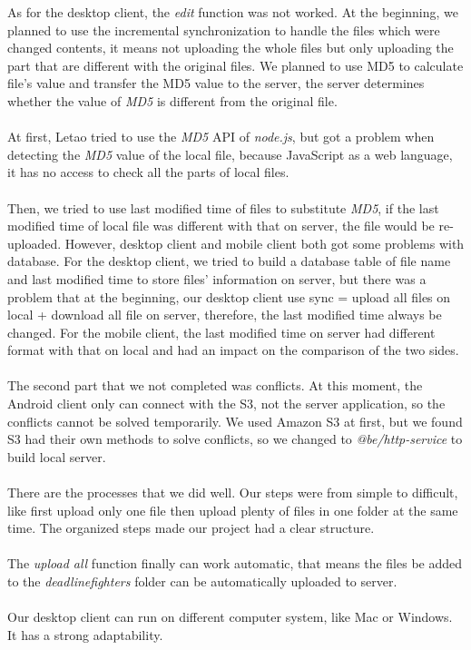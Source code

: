 \documentclass[a4paper]{article}
\begin{document}
{As for the desktop client, the \emph{edit} function was not worked. At the beginning, we planned to use the incremental synchronization to handle the files which were changed contents, it means not uploading the whole files but only uploading the part that are different with the original files. We planned to use MD5 to calculate file’s value and transfer the MD5 value to the server, the server determines whether the value of \emph{MD5} is different from the original file.\\\\
At first, Letao tried to use the \emph{MD5} API of \emph{node.js}, but got a problem when detecting the \emph{MD5} value of the local file, because JavaScript as a web language, it has no access to check all the parts of local files.\\\\
Then, we tried to use last modified time of files to substitute \emph{MD5}, if the last modified time of local file was different with that on server, the file would be re-uploaded. However, desktop client and mobile client both got some problems with database. For the desktop client, we tried to build a database table of file name and last modified time to store files’ information on server, but there was a problem that at the beginning, our desktop client use sync = upload all files on local + download all file on server, therefore, the last modified time always be changed. For the mobile client, the last modified time on server had different format with that on local and had an impact on the comparison of the two sides.\\\\
The second part that we not completed was conflicts. At this moment, the Android client only can connect with the S3, not the server application, so the conflicts cannot be solved temporarily. We used Amazon S3 at first, but we found S3 had their own methods to solve conflicts, so we changed to \emph{@be/http-service} to build local server.\\\\
There are the processes that we did well. Our steps were from simple to difficult, like first upload only one file then upload plenty of files in one folder at the same time. The organized steps made our project had a clear structure. \\\\
The \emph{upload all} function finally can work automatic, that means the files be added to the \emph{deadlinefighters} folder can be automatically uploaded to server.\\\\ 
Our desktop client can run on different computer system, like Mac or Windows. It has a strong adaptability.\\\\



}
\end{document}
